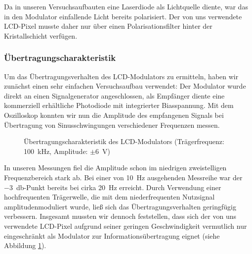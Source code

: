 \documentclass[12pt,a4paper]{article}
\begin{document}
Da in unseren Versuchsaufbauten eine Laserdiode als Lichtquelle diente, war das in den Modulator einfallende Licht bereits polarisiert. Der von uns verwendete LCD-Pixel musste daher nur über einen Polarisationsfilter hinter der Kristallschicht verfügen.

\subsubsection{Übertragungscharakteristik}

Um das Übertragungsverhalten des LCD-Modulators zu ermitteln, haben wir zunächst einen sehr einfachen Versuchsaufbau verwendet: Der Modulator wurde direkt an einen Signalgenerator angeschlossen, als Empfänger diente eine kommerziell erhältliche Photodiode mit integrierter Biasspannung. Mit dem Oszilloskop konnten wir nun die Amplitude des empfangenen Signals bei Übertragung von Sinusschwingungen verschiedener Frequenzen messen.

\begin{figure}[h]
  \centering
  \caption{Übertragungscharakteristik des LCD-Modulators (Trägerfrequenz: \SI{100}{\kilo\hertz}, Amplitude: $\pm$\SI{6}{\volt})}
  \label{fig:lcd_transfer_function}
\end{figure}

In unseren Messungen fiel die Amplitude schon im niedrigen zweistelligen Frequenzbereich stark ab. Bei einer von \SI{10}{\hertz} ausgehenden Messreihe war der \SI{-3}{\decibel}-Punkt bereits bei cirka \SI{20}{\hertz} erreicht. Durch Verwendung einer hochfrequenten Trägerwelle, die mit dem niederfrequenten Nutzsignal amplitudenmoduliert wurde, ließ sich das Übertragungsverhalten geringfügig verbessern. Insgesamt mussten wir dennoch feststellen, dass sich der von uns verwendete LCD-Pixel aufgrund seiner geringen Geschwindigkeit vermutlich nur eingeschränkt als Modulator zur Informationsübertragung eignet (siehe Abbildung \ref{fig:lcd_transfer_function}).
\end{document}

